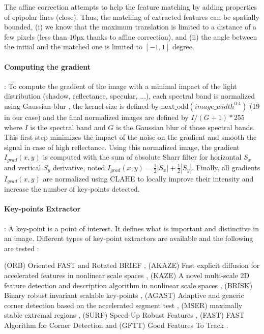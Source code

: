 \documentclass[../thesis.tex]{subfiles}
\begin{document}
	\par The affine correction attempts to help the feature matching by adding properties of epipolar lines (close).
	Thus, the matching of extracted features can be spatially bounded,
	(i) we know that the maximum translation is limited to a distance of a few pixels (less than $10$px thanks to affine correction),
	and (ii) the angle between the initial and the matched one is limited to $[-1,1]$ degree.
	
	\paragraph{Computing the gradient} : \label{sec:pre-processing}
	To compute the gradient of the image with a minimal impact of the light distribution (shadow, reflectance, specular, ...),
	each spectral band is normalized using Gaussian blur \cite{sage0303}, the kernel size is defined by $\text{next\_odd}(image\_width^{0.4})$ (19 in our case)
	and the final normalized images are defined by $I/(G+1)*255$ where $I$ is the spectral band and $G$ is the Gaussian blur of those spectral bands.
	This first step minimizes the impact of the noise on the gradient and smooth the signal in case of high reflectance.
	Using this normalized image, the gradient $I_{grad}(x,y)$ is computed with the sum of absolute Sharr filter \cite{Seitz}
	for horizontal $S_x$ and vertical $S_y$ derivative, noted $I_{grad}(x,y)=\frac{1}{2}|S_x|+\frac{1}{2}|S_y|$.
	Finally, all gradients $I_{grad}(x,y)$ are normalized using CLAHE \cite{Zuiderveld:1994:CLA:180895.180940} to locally improve their intensity and increase the number of key-points detected.%
	
	\paragraph{Key-points Extractor} :
	A key-point is a point of interest. It defines what is important and distinctive in an image.
	Different types of key-point extractors are available and the following are tested :
	
	\par (ORB) Oriented FAST and Rotated BRIEF \cite{Rublee:2011:OEA:2355573.2356268}, 
	(AKAZE) Fast explicit diffusion for accelerated features in nonlinear scale spaces \cite{alcantarilla2011fast}, 
	(KAZE) A novel multi-scale 2D feature detection and description algorithm in nonlinear scale spaces \cite{rs10050756}, 
	(BRISK) Binary robust invariant scalable key-points \cite{leutenegger2011brisk}, 
	(AGAST) Adaptive and generic corner detection based on the accelerated segment test \cite{mair2010adaptive}, 
	(MSER) maximally stable extremal regions \cite{donoser2006efficient}, 
	(SURF) Speed-Up Robust Features \cite{bay2006surf}, 
	(FAST) FAST Algorithm for Corner Detection \cite{trajkovic1998fast}
	and (GFTT) Good Features To Track \cite{shi1994good}.
	
\end{document}
